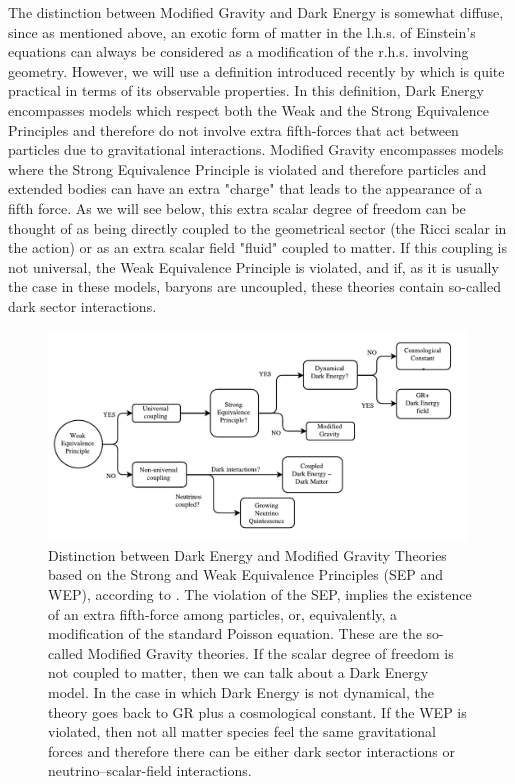 The distinction between Modified Gravity and Dark Energy is somewhat diffuse, since as mentioned above, 
an exotic form of matter in the l.h.s. of Einstein's equations can always be considered as a modification 
of the r.h.s. involving geometry. However, we will use a definition introduced recently by \cite{cite Joyce, Lombrisier, Schmidt}
which is quite practical in terms of its observable properties. 
In this definition, Dark Energy encompasses models which respect both the Weak and the Strong Equivalence
Principles and therefore do not involve extra fifth-forces that act between particles due to gravitational 
interactions. Modified Gravity encompasses models where the Strong Equivalence Principle is violated and therefore 
particles and extended bodies can have an extra "charge" that leads to the appearance of a fifth force.
As we will see below, this extra scalar degree of freedom can be thought of as being directly coupled
to the geometrical sector (the Ricci scalar in the action) or as an extra scalar field "fluid" 
coupled to matter.
If this coupling is not universal, the Weak Equivalence Principle is violated, and if, as it is 
usually the case in these models, baryons are uncoupled, these theories contain so-called 
dark sector interactions.

\begin{figure}[H]

\begin{center}
\includegraphics[width=0.99\textwidth]
{Figures/DE-MG.pdf}
\end{center}
\caption[Dark Energy - Modified Gravity Flowchart]{Distinction between Dark Energy and
Modified Gravity Theories based on the Strong and Weak Equivalence Principles (SEP and WEP), according to \cite{Joyce, Lombrisier}.
The violation of the SEP, implies the existence of an extra fifth-force among particles, 
or, equivalently, a modification of the standard Poisson equation. These are the so-called Modified Gravity theories.
If the scalar degree of freedom is not coupled to matter, then we can talk about a Dark Energy model.
In the case in which Dark Energy is not dynamical, the theory goes back to GR plus a cosmological constant.
If the WEP is violated, then not all matter species feel the same gravitational forces and therefore
there can be either dark sector interactions or neutrino--scalar-field interactions.
}
\end{figure}

